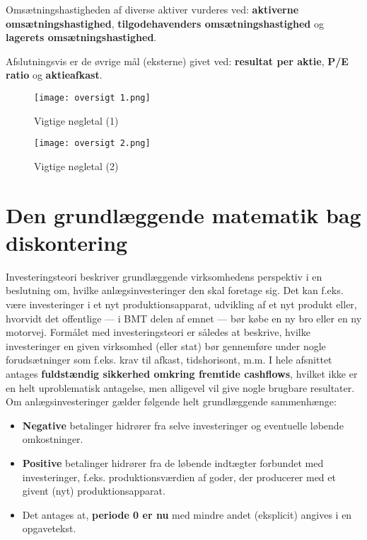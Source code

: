 \documentclass[10pt,reqno, usenames]{article}
\begin{document}
\vspace{10 pt}

Omsætningshastigheden af diverse aktiver vurderes ved: \textbf{aktiverne omsætningshastighed}, \textbf{tilgodehavenders omsætningshastighed} og \textbf{lagerets omsætningshastighed}. 

\vspace{10 pt}

Afslutningsvis er de øvrige mål (eksterne) givet ved: \textbf{resultat per aktie}, \textbf{P/E ratio} og \textbf{aktieafkast}.

\begin{figure}[h]
     \centering
     \texttt{[image: oversigt 1.png]}
     \caption{Vigtige nøgletal (1)}
     \label{Figur 1}
\end{figure} 

\newpage

\begin{figure}[h]
     \centering
     \texttt{[image: oversigt 2.png]}
     \caption{Vigtige nøgletal (2)}
     \label{Figur 1}
\end{figure} 

\section{Den grundlæggende matematik bag diskontering}
Investeringsteori beskriver grundlæggende virksomhedens perspektiv i en beslutning om, hvilke anlægsinvesteringer den skal foretage sig. Det kan f.eks. være investeringer i et nyt produktionsapparat, udvikling af et nyt produkt eller, hvorvidt det offentlige — i BMT delen af emnet — bør købe en ny bro eller en ny motorvej. Formålet med investeringsteori er således at beskrive, hvilke investeringer en given virksomhed (eller stat) bør gennemføre under nogle forudsætninger som f.eks. krav til afkast, tidshorisont, m.m. I hele afsnittet antages \textbf{fuldstændig sikkerhed omkring fremtide cashflows}, hvilket ikke er en helt uproblematisk antagelse, men alligevel vil give nogle brugbare resultater. Om anlægsinvesteringer gælder følgende helt grundlæggende sammenhænge: 

\begin{itemize}
    \item \textbf{Negative} betalinger hidrører fra selve investeringer og eventuelle løbende omkostninger. 
    \item \textbf{Positive} betalinger hidrører fra de løbende indtægter forbundet med investeringer, f.eks. produktionsværdien af goder, der producerer med et givent (nyt) produktionsapparat. 
    \item Det antages at, \textbf{periode 0 er nu} med mindre andet (eksplicit) angives i en opgavetekst. 
\end{itemize}
\end{document}
